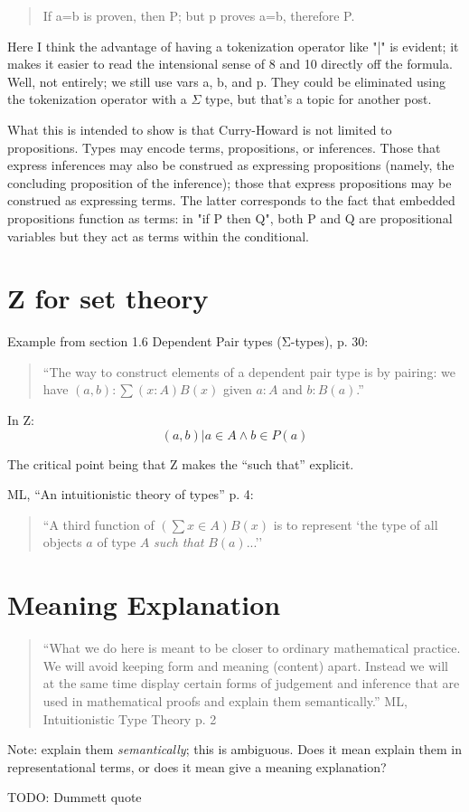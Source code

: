 \documentclass{article}
\begin{document}
\begin{quote}
    If a=b is proven, then P; but p proves a=b, therefore P.
\end{quote}

Here I think the advantage of having a tokenization operator like "|" is evident; it makes it easier to read the intensional sense of 8 and 10 directly off the formula.  Well, not entirely; we still use vars a, b, and p.   They could be eliminated using the tokenization operator with a \(\Sigma\) type, but that's a topic for another post.

What this is intended to show is that Curry-Howard is not limited to propositions.  Types may encode terms, propositions, or inferences.   Those that express inferences may also be construed as expressing propositions (namely, the concluding proposition of the inference); those that express propositions may be construed as expressing terms.  The latter corresponds to the fact that embedded propositions function as terms: in "if P then Q", both P and Q are propositional variables but they act as terms within the conditional.

\section{Z for set theory}

Example from section 1.6 Dependent Pair types (Σ-types), p. 30:

\begin{quote}
``The way to construct elements of a dependent pair type is by
pairing: we have \((a,b) : ∑(x:A) B(x)\) given \(a : A\) and \(b :
B(a)\).''
\end{quote}

In Z: \[ {(a,b) | a\in A \land b\in P(a)} \]

The critical point being that Z makes the ``such that'' explicit.

ML, ``An intuitionistic theory of types'' p. 4:
\begin{quote}
``A third function of \((\sum x\in A)B(x)\) is to represent `the type
of all objects \(a\) of type \(A\) \emph{such that} \(B(a)\)...''
\end{quote}

\section{Meaning Explanation}

\begin{quote}
``What we do here is meant to be closer to ordinary mathematical practice. We will avoid keeping form and meaning (content) apart. Instead we will at the same time display certain forms of judgement and inference that are used in mathematical proofs and explain them semantically.'' ML, Intuitionistic Type Theory p. 2
\end{quote}

Note: explain them \emph{semantically}; this is ambiguous.  Does it
mean explain them in representational terms, or does it mean give a
meaning explanation?

TODO:  Dummett quote
\end{document}
